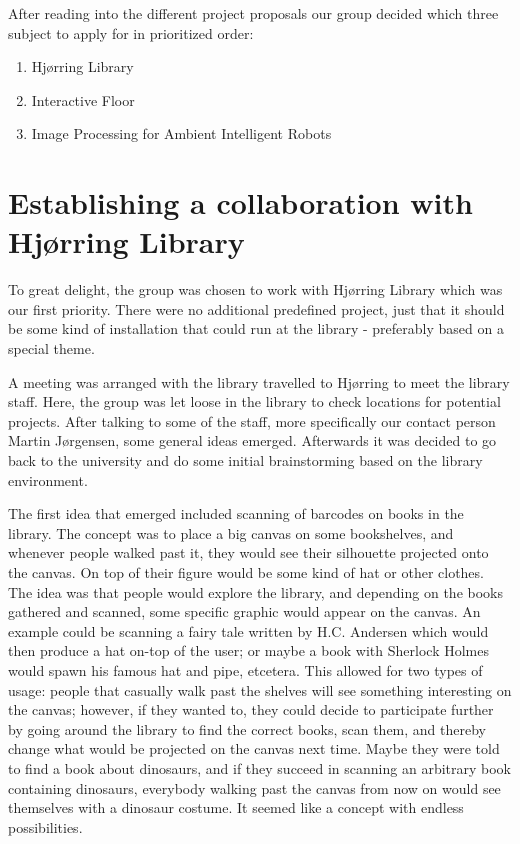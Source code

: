 After reading into the different project proposals our group decided which three subject to apply for in prioritized order:

\begin{enumerate} 
\item Hj{\o}rring Library 
\item Interactive Floor 
\item Image Processing for Ambient Intelligent Robots 
\end{enumerate}

\section{Establishing a collaboration with Hj{\o}rring Library}
To great delight, the group was chosen to work with Hj{\o}rring Library which was our first priority. There were no additional predefined project, just that it should be some kind of installation that could run at the library - preferably based on a special theme.

A meeting was arranged with the library travelled to Hj{\o}rring to meet the library staff. Here, the group was let loose in the library to check locations for potential projects. After talking to some of the staff, more specifically our contact person Martin J{\o}rgensen, some general ideas emerged. Afterwards it was decided to go back to the university and do some initial brainstorming based on the library environment.

The first idea that emerged included scanning of barcodes on books in the library. The concept was to place a big canvas on some bookshelves, and whenever people walked past it, they would see their silhouette projected onto the canvas. On top of their figure would be some kind of hat or other clothes. The  idea was that people would explore the library, and depending on the books gathered and scanned, some specific graphic would appear on the canvas. An example could be scanning a fairy tale written by H.C. Andersen which would then produce a hat on-top of the user; or maybe a book with Sherlock Holmes would spawn his famous hat and pipe, etcetera. This allowed for two types of usage: people that casually walk past the shelves will see something interesting on the canvas; however, if they wanted to, they could decide to participate further by going around the library to find the correct books, scan them, and thereby change what would be projected on the canvas next time. Maybe they were told to find a book about dinosaurs, and if they succeed in scanning an arbitrary book containing dinosaurs, everybody walking past the canvas from now on would see themselves with a dinosaur costume. It seemed like a concept with endless possibilities.


